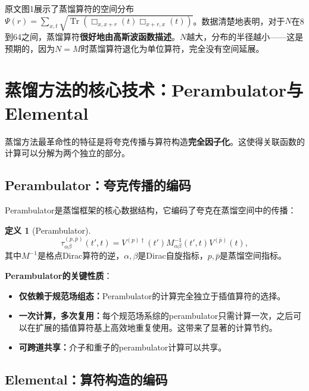\documentclass[12pt,a4paper]{ctexart}
\theoremstyle{definition}
\newtheorem{definition}{定义}[section]
\begin{document}
原文图1展示了蒸馏算符的空间分布$\Psi(r) = \sum_{x,t} \sqrt{\operatorname{Tr}(\Box_{x,x+r}(t)\Box_{x+r,x}(t))}$。数据清楚地表明，对于$N$在8到64之间，蒸馏算符\textbf{很好地由高斯波函数描述}。$N$越大，分布的半径越小——这是预期的，因为$N = M$时蒸馏算符退化为单位算符，完全没有空间延展\cite{Peardon2009}。

\section{蒸馏方法的核心技术：Perambulator与Elemental}

蒸馏方法最革命性的特征是将夸克传播与算符构造\textbf{完全因子化}\cite{Peardon2009,Egerer2021a}。这使得关联函数的计算可以分解为两个独立的部分。

\subsection{Perambulator：夸克传播的编码}

Perambulator是蒸馏框架的核心数据结构，它编码了夸克在蒸馏空间中的传播\cite{Peardon2009,Egerer2021a}：

\begin{definition}[Perambulator]
\begin{equation}
\tau^{(p,\bar{p})}_{\alpha\beta}(t', t) = V^{(p)\dagger}(t') M^{-1}_{\alpha\beta}(t', t) V^{(\bar{p})}(t),
\label{eq:perambulator}
\end{equation}
其中$M^{-1}$是格点Dirac算符的逆，$\alpha,\beta$是Dirac自旋指标，$p,\bar{p}$是蒸馏空间指标。
\end{definition}

\textbf{Perambulator的关键性质}\cite{Peardon2009,NoteGluonPDFs}：

\begin{itemize}
    \item \textbf{仅依赖于规范场组态：}Perambulator的计算完全独立于插值算符的选择。
    \item \textbf{一次计算，多次复用：}每个规范场系综的perambulator只需计算一次，之后可以在扩展的插值算符基上高效地重复使用。这带来了显著的计算节约\cite{NoteGluonPDFs}。
    \item \textbf{可跨道共享：}介子和重子的perambulator计算可以共享。
\end{itemize}

\subsection{Elemental：算符构造的编码}
\end{document}
